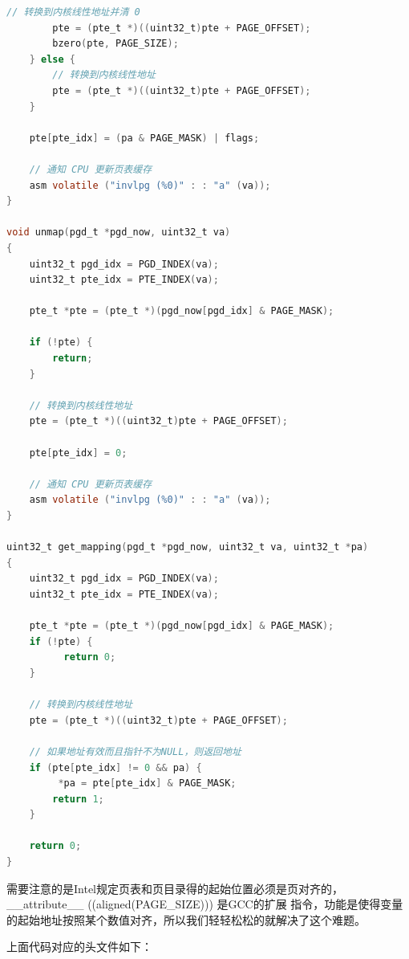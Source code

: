 \begin{lstlisting}[language = C, caption = mm/vmm.c]
		// 转换到内核线性地址并清 0
		pte = (pte_t *)((uint32_t)pte + PAGE_OFFSET);
		bzero(pte, PAGE_SIZE);
	} else {
		// 转换到内核线性地址
		pte = (pte_t *)((uint32_t)pte + PAGE_OFFSET);
	}

	pte[pte_idx] = (pa & PAGE_MASK) | flags;

	// 通知 CPU 更新页表缓存
	asm volatile ("invlpg (%0)" : : "a" (va));
}

void unmap(pgd_t *pgd_now, uint32_t va)
{
	uint32_t pgd_idx = PGD_INDEX(va);
	uint32_t pte_idx = PTE_INDEX(va);

	pte_t *pte = (pte_t *)(pgd_now[pgd_idx] & PAGE_MASK);

	if (!pte) {
		return;
	}

	// 转换到内核线性地址
	pte = (pte_t *)((uint32_t)pte + PAGE_OFFSET);

	pte[pte_idx] = 0;

	// 通知 CPU 更新页表缓存
	asm volatile ("invlpg (%0)" : : "a" (va));
}

uint32_t get_mapping(pgd_t *pgd_now, uint32_t va, uint32_t *pa)
{
	uint32_t pgd_idx = PGD_INDEX(va);
	uint32_t pte_idx = PTE_INDEX(va);

	pte_t *pte = (pte_t *)(pgd_now[pgd_idx] & PAGE_MASK);
	if (!pte) {
	      return 0;
	}
	
	// 转换到内核线性地址
	pte = (pte_t *)((uint32_t)pte + PAGE_OFFSET);

	// 如果地址有效而且指针不为NULL，则返回地址
	if (pte[pte_idx] != 0 && pa) {
		 *pa = pte[pte_idx] & PAGE_MASK;
		return 1;
	}

	return 0;
}
\end{lstlisting}

\par 需要注意的是Intel规定页表和页目录得的起始位置必须是页对齐的，\_\_attribute\_\_ ((aligned(PAGE\_SIZE))) 是GCC的扩展\allowbreak
指令，功能是使得变量的起始地址按照某个数值对齐，所以我们轻轻松松的就解决了这个难题。

\par 上面代码对应的头文件如下：

